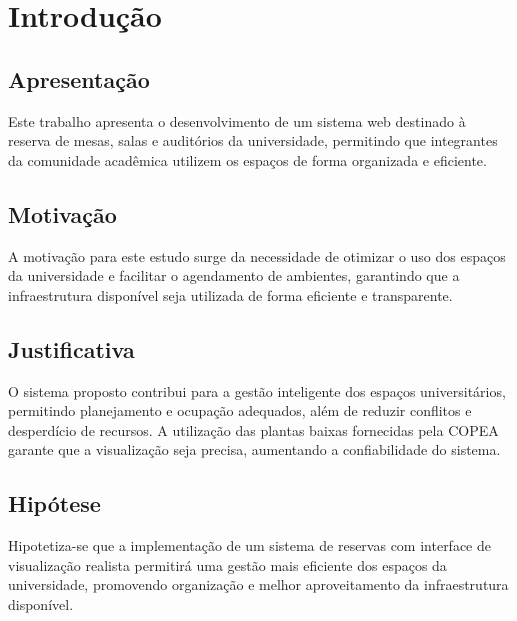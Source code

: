 \chapter{Introdução}\label{chp:INTRO}
\section{Apresentação}\label{sec:APRESENT}

Este trabalho apresenta o desenvolvimento de um sistema web destinado à reserva de mesas, salas e auditórios da universidade, permitindo que integrantes da comunidade acadêmica utilizem os espaços de forma organizada e eficiente.

\section{Motivação}\label{sec:MOTIVACAO}

A motivação para este estudo surge da necessidade de otimizar o uso dos espaços da universidade e facilitar o agendamento de ambientes, garantindo que a infraestrutura disponível seja utilizada de forma eficiente e transparente.

\section{Justificativa}\label{sec:Justificativa}

O sistema proposto contribui para a gestão inteligente dos espaços universitários, permitindo planejamento e ocupação adequados, além de reduzir conflitos e desperdício de recursos. A utilização das plantas baixas fornecidas pela COPEA garante que a visualização seja precisa, aumentando a confiabilidade do sistema.

\section{Hipótese}\label{sec:HIPOTESE}
Hipotetiza-se que a implementação de um sistema de reservas com interface de visualização realista permitirá uma gestão mais eficiente dos espaços da universidade, promovendo organização e melhor aproveitamento da infraestrutura disponível.

